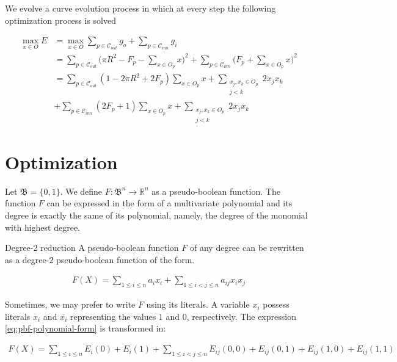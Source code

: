 We evolve a curve evolution process in which at every step the following optimization process is solved

\begin{align}\label{eq:max-energy}
	\max_{x \in O}{E} &= \max_{x \in O} \sum_{p \in \mathcal{C}_{out}}{g_o} + \sum_{p \in \mathcal{C}_{inn}}{g_i}\\\nonumber 
	&=\sum_{p \in \mathcal{C}_{out}}{ \big( \pi R^2 - F_p - \sum_{x \in O_p}{x}\big)^2} + \sum_{p \in \mathcal{C}_{inn}}{ \big( F_p + \sum_{x \in O_p}{x}\big)^2}\\\nonumber
	&= \sum_{p \in \mathcal{C}_{out}}{ (1 - 2\pi R^2 + 2F_p) \sum_{x \in O_p}{x} + \sum_{ \substack{ x_j,x_k \in O_p \\ j < k}}{2x_jx_k}}\\\nonumber
	&+ \sum_{p \in \mathcal{C}_{inn}}{(2F_p + 1)\sum_{x \in O_p}{x} + \sum_{\substack{ x_j,x_k \in O_p \\ j < k}}{2x_jx_k}}	
\end{align}


\section{Optimization}

Let $\mathfrak{B}=\{0,1\}$. We define $F:\mathfrak{B}^n\rightarrow \mathbb{R}^n$ as a pseudo-boolean function. The function $F$ can be expressed in the form of a multivariate polynomial and its degree is exactly the same of its polynomial, namely, the degree of the monomial with highest degree.

\begin{claim}{Degree-2 reduction}
	A pseudo-boolean function $F$ of any degree can be rewritten as a degree-2 pseudo-boolean function of the form.	
	
\begin{align}\label{eq:pbf-polynomial-form}
	F(X) = \sum_{1\leq i\leq n}{a_ix_i} + \sum_{1 \leq i < j \leq n}{a_{ij}x_ix_j}	
\end{align}	
	
\end{claim}

Sometimes, we may prefer to write $F$ using its literals. A variable $x_i$ possess literals $x_i$ and $\overline{x_i}$ representing the values $1$ and $0$, respectively. The expression \eqref{eq:pbf-polynomial-form} is transformed in:

\begin{align}
	F(X) = \sum_{1\leq i\leq n}{E_i(0) + E_i(1)} + \sum_{1 \leq i < j \leq n}{E_{ij}(0,0) + E_{ij}(0,1) + E_{ij}(1,0) + E_{ij}(1,1)}
\end{align}


